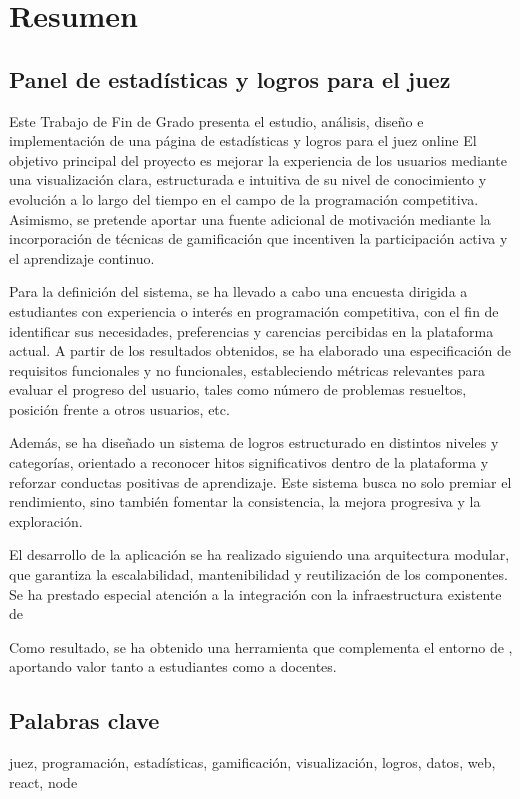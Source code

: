 \chapter{Resumen}

\section*{Panel de estadísticas y logros para el juez \aer}
\vspace{-0.5em}

Este Trabajo de Fin de Grado presenta el estudio, análisis, diseño e implementación de una página de estadísticas y logros para el juez online \aer El objetivo principal del proyecto es mejorar la experiencia de los usuarios mediante una visualización clara, estructurada e intuitiva de su nivel de conocimiento y evolución a lo largo del tiempo en el campo de la programación competitiva. Asimismo, se pretende aportar una fuente adicional de motivación mediante la incorporación de técnicas de gamificación que incentiven la participación activa y el aprendizaje continuo.

Para la definición del sistema, se ha llevado a cabo una encuesta dirigida a estudiantes con experiencia o interés en programación competitiva, con el fin de identificar sus necesidades, preferencias y carencias percibidas en la plataforma actual. A partir de los resultados obtenidos, se ha elaborado una especificación de requisitos funcionales y no funcionales, estableciendo métricas relevantes para evaluar el progreso del usuario, tales como número de problemas resueltos, posición frente a otros usuarios, etc. 

Además, se ha diseñado un sistema de logros estructurado en distintos niveles y categorías, orientado a reconocer hitos significativos dentro de la plataforma y reforzar conductas positivas de aprendizaje. Este sistema busca no solo premiar el rendimiento, sino también fomentar la consistencia, la mejora progresiva y la exploración.

El desarrollo de la aplicación se ha realizado siguiendo una arquitectura modular, que garantiza la escalabilidad, mantenibilidad y reutilización de los componentes. Se ha prestado especial atención a la integración con la infraestructura existente de \aer

Como resultado, se ha obtenido una herramienta que complementa el entorno de \aer, aportando valor tanto a estudiantes como a docentes.

\section*{Palabras clave}
\vspace{-0.5em}

\noindent juez, programación, estadísticas, gamificación, visualización, logros, datos, web, react, node